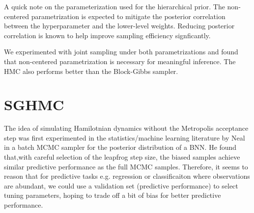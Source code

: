 \documentclass[12pt]{report}
\begin{document}
A quick note on the parameterization used for the hierarchical prior. The non-centered parametrization is expected to mitigate the posterior correlation between the hyperparameter and the lower-level weights. Reducing posterior correlation is known to help improve sampling efficiency signficantly. 

We experimented with joint sampling under both parametrizations and found that non-centered parametrization is necessary for meaningful inference. The HMC also performs better than the Block-Gibbs sampler.

\section{SGHMC}
The idea of simulating Hamilotnian dynamics without the Metropolis acceptance step was first experimented in the statistics/machine learning literature by Neal \cite{neal1993bayesian} in a batch MCMC sampler for the posterior distribution of a BNN. He found that,with careful selection of the leapfrog step size, the biased samples achieve similar predictive performance as the full MCMC samples. Therefore, it seems to reason that for predictive tasks e.g. regression or classificaiton where observations are abundant, we could 
use a validation set (predictive performance) to select tuning parameters, hoping to trade off a bit of bias for better predictive performance. 
\end{document}
